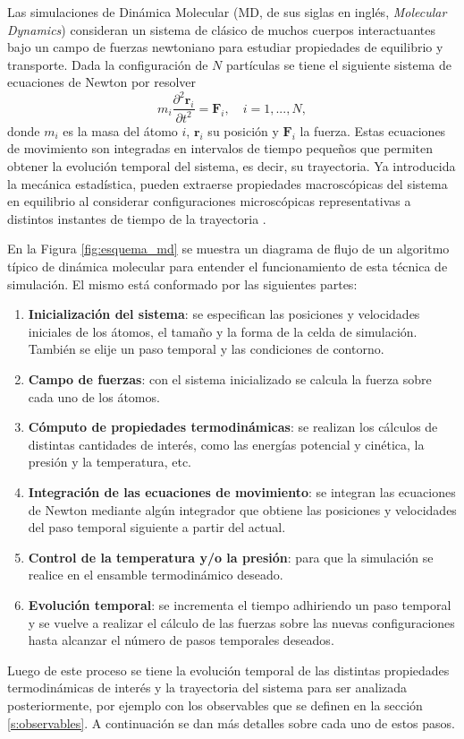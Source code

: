 Las simulaciones de Dinámica Molecular (MD, de sus siglas en inglés, 
\textit{Molecular Dynamics}) consideran un sistema de clásico de muchos cuerpos 
interactuantes bajo un campo de fuerzas newtoniano para estudiar propiedades de 
equilibrio y transporte. Dada la configuración de $N$ partículas se tiene el 
siguiente sistema de ecuaciones de Newton por resolver
\begin{equation}
    m_i \frac{\partial^2 \mathbf{r}_i}{\partial t^2} = \mathbf{F}_i, \quad i = 1,..., N,
\end{equation}
donde $m_i$ es la masa del átomo $i$, $\mathbf{r}_i$ su posición y $\mathbf{F}_i$
la fuerza. Estas ecuaciones de movimiento son integradas en intervalos de tiempo
pequeños que permiten obtener la evolución temporal del sistema, es decir, su
trayectoria. Ya introducida la mecánica estadística, pueden extraerse propiedades
macroscópicas del sistema en equilibrio al considerar configuraciones microscópicas
representativas a distintos instantes de tiempo de la trayectoria
\cite{allen2017, frenkel2001}.

En la Figura \ref{fig:esquema_md} se muestra un diagrama de flujo de un algoritmo
típico de dinámica molecular para entender el funcionamiento de esta técnica de 
simulación. El mismo está conformado por las siguientes partes:
\begin{enumerate}
    \item \textbf{Inicialización del sistema}: se especifican las posiciones y
        velocidades iniciales de los átomos, el tamaño y la forma de la celda de 
        simulación. También se elije un paso temporal y las condiciones de 
        contorno.
    \item \textbf{Campo de fuerzas}: con el sistema inicializado se calcula la 
        fuerza sobre cada uno de los átomos.
    \item \textbf{Cómputo de propiedades termodinámicas}: se realizan los
        cálculos de distintas cantidades de interés, como las energías potencial
        y cinética, la presión y la temperatura, etc.
    \item \textbf{Integración de las ecuaciones de movimiento}: se integran las
        ecuaciones de Newton mediante algún integrador que obtiene las posiciones
        y velocidades del paso temporal siguiente a partir del actual.
    \item \textbf{Control de la temperatura y/o la presión}: para que la 
        simulación se realice en el ensamble termodinámico deseado.
    \item \textbf{Evolución temporal}: se incrementa el tiempo adhiriendo un
        paso temporal y se vuelve a realizar el cálculo de las fuerzas sobre las 
        nuevas configuraciones hasta alcanzar el número de pasos temporales 
        deseados.
\end{enumerate}
Luego de este proceso se tiene la evolución temporal de las distintas propiedades
termodinámicas de interés y la trayectoria del sistema para ser analizada 
posteriormente, por ejemplo con los observables que se definen en la sección 
\ref{s:observables}. A continuación se dan más detalles sobre cada uno de estos pasos.


